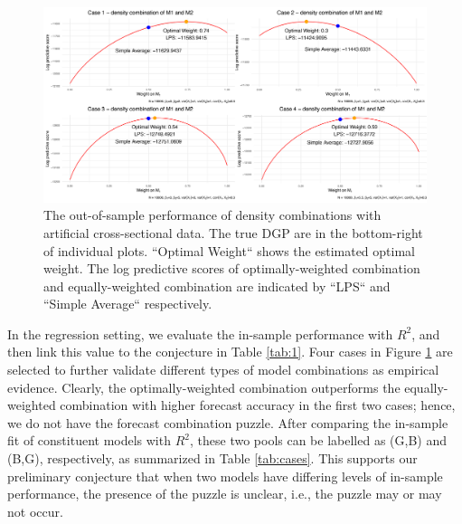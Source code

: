 \documentclass{monashthesis}
\begin{document}
\begin{figure}[ht]
\centering
\includegraphics[scale=0.53]{figures/con_cases.png}
\caption{The out-of-sample performance of density combinations with artificial cross-sectional data. The true DGP are in the bottom-right of individual plots. ``Optimal Weight`` shows the estimated optimal weight. The log predictive scores of optimally-weighted combination and equally-weighted combination are indicated by ``LPS`` and ``Simple Average`` respectively.}
\label{fig:cases}
\end{figure}

In the regression setting, we evaluate the in-sample performance with \(R^2\), and then link this value to the conjecture in Table \ref{tab:1}. Four cases in Figure \ref{fig:cases} are selected to further validate different types of model combinations as empirical evidence. Clearly, the optimally-weighted combination outperforms the equally-weighted combination with higher forecast accuracy in the first two cases; hence, we do not have the forecast combination puzzle. After comparing the in-sample fit of constituent models with \(R^2\), these two pools can be labelled as (G,B) and (B,G), respectively, as summarized in Table \ref{tab:cases}. This supports our preliminary conjecture that when two models have differing levels of in-sample performance, the presence of the puzzle is unclear, i.e., the puzzle may or may not occur.
\end{document}
